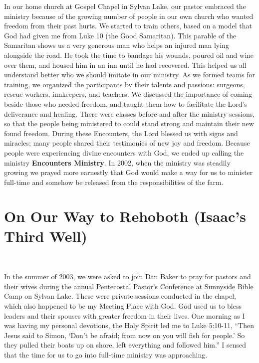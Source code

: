 \documentclass[twoside, 12pt]{book}
\begin{document}
In our home church at Gospel Chapel in Sylvan Lake, our pastor embraced the ministry because of the growing number of people in our own church who wanted freedom from their past hurts. We started to train others, based on a model that God had given me from Luke 10 (the Good Samaritan). This parable of the Samaritan shows us a very generous man who helps  an injured man lying alongside the road. He took the time to bandage his wounds, poured oil and wine over them, and housed him in an inn until he had recovered. This helped us all understand better who we should imitate in our ministry. As we formed teams for training, we organized the participants by their talents and passions: surgeons, rescue workers, innkeepers, and teachers. We discussed the importance of coming beside those who needed freedom, and taught them how to facilitate the Lord’s deliverance and healing. There were classes before and after the ministry sessions, so that the people being ministered to could stand strong and maintain their new found freedom. During these Encounters, the Lord blessed us with signs and miracles; many people shared their testimonies of new joy and freedom. Because people were experiencing divine encounters with God, we ended up calling the ministry \textbf{Encounters Ministry}. In 2002, when the ministry was steadily growing we prayed more earnestly that God would make a way for us to minister full-time and somehow be released from the responsibilities of the farm.


\section{On Our Way to Rehoboth (Isaac's Third Well)}
\

In the summer of 2003, we were asked to join Dan Baker to pray for pastors and their wives during the annual Pentecostal Pastor’s Conference at Sunnyside Bible Camp on Sylvan Lake. These were private sessions conducted in the chapel, which also happened to be my Meeting Place with God. God used us to bless leaders and their spouses with greater freedom in their lives. One morning as I was having my personal devotions, the Holy Spirit led me to Luke 5:10-11, “Then Jesus said to Simon, ‘Don’t be afraid; from now on you will fish for people.’ So they pulled their boats up on shore, left everything and followed him.” I sensed that the time for us to go into full-time ministry was approaching. 
\end{document}
